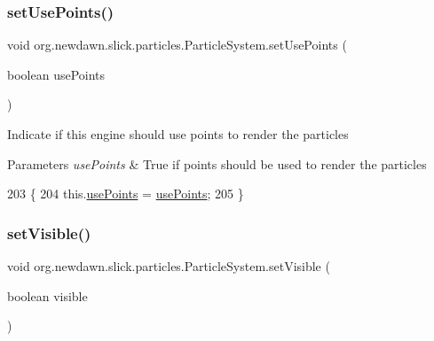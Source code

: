 \subsubsection{\texorpdfstring{set\+Use\+Points()}{setUsePoints()}}
{\footnotesize\ttfamily void org.\+newdawn.\+slick.\+particles.\+Particle\+System.\+set\+Use\+Points (\begin{DoxyParamCaption}\item[{boolean}]{use\+Points }\end{DoxyParamCaption})\hspace{0.3cm}{\ttfamily [inline]}}

Indicate if this engine should use points to render the particles


\begin{DoxyParams}{Parameters}
{\em use\+Points} & True if points should be used to render the particles \\
\hline
\end{DoxyParams}

\begin{DoxyCode}
203                                                 \{
204         this.\mbox{\hyperlink{classorg_1_1newdawn_1_1slick_1_1particles_1_1_particle_system_ad0949468683934abaf4fb0f3ae38004b}{usePoints}} = \mbox{\hyperlink{classorg_1_1newdawn_1_1slick_1_1particles_1_1_particle_system_ad0949468683934abaf4fb0f3ae38004b}{usePoints}};
205     \}
\end{DoxyCode}
\mbox{\label{classorg_1_1newdawn_1_1slick_1_1particles_1_1_particle_system_a37d6c2e79bd8b822c8cb8eb34a279576}} 
\subsubsection{\texorpdfstring{set\+Visible()}{setVisible()}}
{\footnotesize\ttfamily void org.\+newdawn.\+slick.\+particles.\+Particle\+System.\+set\+Visible (\begin{DoxyParamCaption}\item[{boolean}]{visible }\end{DoxyParamCaption})\hspace{0.3cm}{\ttfamily [inline]}}

